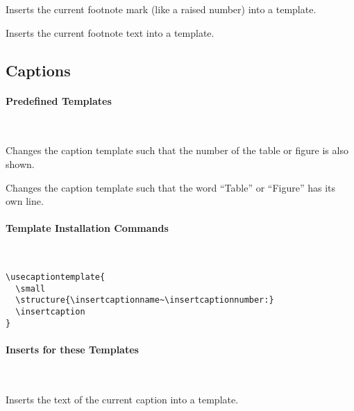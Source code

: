 \begin{command}{\insertfootnotemark}
  Inserts the current footnote mark (like a raised number) into a
  template. 
\end{command}

\begin{command}{\insertfootnotetext}
  Inserts the current footnote text into a template. 
\end{command}





\subsection{Captions}
\label{section-template-caption}

\paragraph{Predefined Templates}\

\begin{command}{\beamertemplatecaptionwithnumber}
  Changes the caption template such that the number of the
  table or figure is also shown.
\end{command}

\begin{command}{\beamertemplatecaptionownline}
  Changes the caption template such that the word ``Table''
  or ``Figure'' has its own line.
\end{command}



\paragraph{Template Installation Commands}\

\begin{command}{\usecaptiontemplate{}}
  \example
\begin{verbatim}
\usecaptiontemplate{
  \small
  \structure{\insertcaptionname~\insertcaptionnumber:}
  \insertcaption
}
\end{verbatim}
\end{command}



\paragraph{Inserts for these Templates}\
 
\begin{command}{\insertcaption}
  Inserts the text of the current caption into a template.
\end{command}

